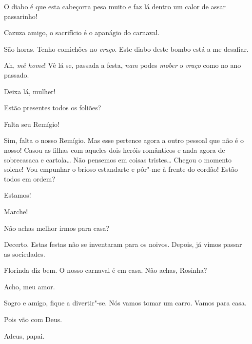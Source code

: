 \begin{linenumbers}
  O diabo é que esta cabeçorra
pesa muito e faz lá dentro um calor de assar passarinho!

 Cazuza amigo, o sacrifício é o apanágio do carnaval.

 São horas. Tenho comichões no \textit{vraço}.  Este diabo deste bombo está a
me desafiar.

 Ah, \textit{mê home}! Vê lá se, passada a festa,
\textit{nam} podes \textit{mober} o \textit{vraço} como no ano passado.

 Deixa lá, mulher!

 Estão presentes todos os foliões?

 Falta seu Remígio!

 Sim, falta o nosso Remígio. Mas esse pertence agora a
outro pessoal que não é o nosso! Casou as filhas com aqueles dois heróis
românticos e anda agora de sobrecasaca e cartola\ldots{} Não pensemos em coisas
tristes\ldots{}  Chegou o momento solene! Vou
empunhar o brioso estandarte e 
pôr"-me à frente do cordão! Estão todos em ordem?

 Estamos!

 Marche!  










  Não achas melhor irmos para casa?

 Decerto. Estas festas não se inventaram para os noivos.
Depois, já vimos passar as sociedades.

 Florinda diz bem. O nosso carnaval é em casa. Não achas,
Rosinha?

 Acho, meu amor.

 Sogro e amigo, fique a divertir"-se. Nós vamos tomar um carro.
Vamos para casa.

 Pois vão com Deus.  

 Adeus, papai.


\end{linenumbers}
